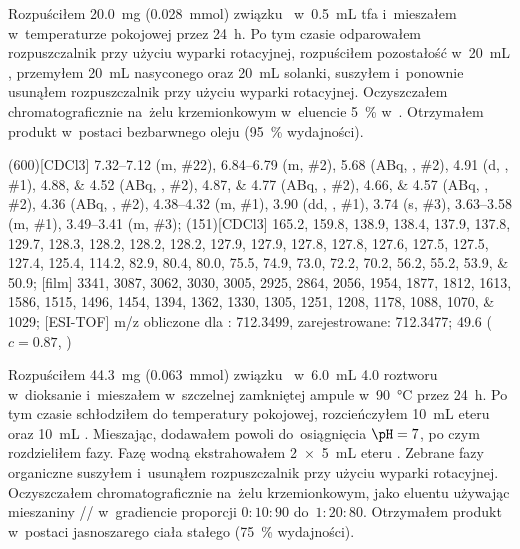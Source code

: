 Rozpuściłem \SI{20.0}{\milli\gram} (\SI{0.028}{\milli\mol}) związku~
	w~\SI{0.5}{\milli\liter} \gls{tfa} i~mieszałem w~temperaturze pokojowej przez \SI{24}{\hour}.
Po tym czasie odparowałem rozpuszczalnik przy użyciu wyparki rotacyjnej,
	rozpuściłem pozostałość w~\SI{20}{\milli\liter} ,
	przemyłem \SI{20}{\milli\liter} nasyconego  oraz \SI{20}{\milli\liter} solanki,
	suszyłem  i~ponownie usunąłem rozpuszczalnik przy użyciu wyparki rotacyjnej.
Oczyszczałem chromatograficznie na~żelu krzemionkowym w~eluencie \SI{5}{\percent}  w~.
Otrzymałem produkt w~postaci bezbarwnego oleju (\SI{95}{\percent} wydajności).

\begin{fullexp}
	\NMR(600)[CDCl3] \numrange{7.32}{7.12} (m, \#{22}), \numrange{6.84}{6.79} (m, \#{2}), \num{5.68} (ABq, , \#{2}), \num{4.91} (d, , \#{1}), \numlist{4.88;4.52} (ABq, , \#{2}), \numlist{4.87;4.77} (ABq, , \#{2}), \numlist{4.66;4.57} (ABq, , \#{2}), \num{4.36} (ABq, , \#{2}), \numrange{4.38}{4.32} (m, \#{1}), \num{3.90} (dd, , \#{1}), \num{3.74} (s, \#{3}), \numrange{3.63}{3.58} (m, \#{1}), \numrange{3.49}{3.41} (m, \#{3});
	(151)[CDCl3] \numlist{165.2; 159.8; 138.9; 138.4; 137.9; 137.8; 129.7; 128.3; 128.2; 128.2; 128.2; 127.9; 127.9; 127.8; 127.8; 127.6; 127.5; 127.5; 127.4; 125.4; 114.2; 82.9; 80.4; 80.0; 75.5; 74.9; 73.0; 72.2; 70.2; 56.2; 55.2; 53.9; 50.9};
	[film] \numlist{3341; 3087; 3062; 3030; 3005; 2925; 2864; 2056; 1954; 1877; 1812; 1613; 1586; 1515; 1496; 1454; 1394; 1362; 1330; 1305; 1251; 1208; 1178; 1088; 1070; 1029};
	[ESI-TOF] m/z obliczone dla : \num{712.3499}, zarejestrowane: \num{712.3477};
	\data{[$\alpha^{23}_D$]~$=$} \num{49.6} ($c = 0.87$, )
\end{fullexp}

Rozpuściłem \SI{44.3}{\milli\gram} (\SI{0.063}{\milli\mol}) związku~
	w~\SI{6.0}{\milli\liter} \SI{4.0}{\Molar} roztworu  w~dioksanie i~mieszałem
	w~szczelnej zamkniętej ampule w~\SI{90}{\degreeCelsius} przez \SI{24}{\hour}.
Po tym czasie schłodziłem do temperatury pokojowej, rozcieńczyłem \SI{10}{\milli\liter}
	eteru  oraz \SI{10}{\milli\liter} .
Mieszając, dodawałem powoli  do~osiągnięcia $\pH = 7$, po czym rozdzieliłem fazy.
Fazę wodną ekstrahowałem \SI[product-units = single]{2 x 5}{\mL} eteru .
Zebrane fazy organiczne suszyłem  i~usunąłem rozpuszczalnik przy użyciu wyparki rotacyjnej.
Oczyszczałem chromatograficznie na~żelu krzemionkowym, jako eluentu używając mieszaniny
	// w~gradiencie proporcji $0:10:90$ do~$1:20:80$.
Otrzymałem produkt w~postaci jasnoszarego ciała stałego (\SI{75}{\percent} wydajności).

